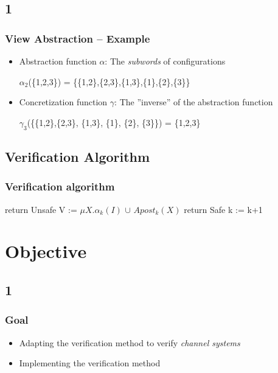 \documentclass[handout]{beamer}
\begin{document}
\subsection*{1}
\begin{frame}
\frametitle{View Abstraction -- Example}
\begin{itemize}
\item
Abstraction function $\alpha$: The \emph{subwords} of configurations
\begin{example}[Abstraction]
  $\alpha_2$(\{1,2,3\}) = \{\{1,2\},\{2,3\},\{1,3\},\{1\},\{2\},\{3\}\}
\end{example}
\item
Concretization function $\gamma$: The ''inverse'' of the abstraction function
\begin{example}[Concretization]
  $\gamma_3$(\{\{1,2\},\{2,3\}, \{1,3\}, \{1\}, \{2\}, \{3\}\}) = \{1,2,3\}
\end{example}
\end{itemize}
\end{frame}
\subsection{Verification Algorithm}
\begin{frame}
  \frametitle{Verification algorithm} %
  \footnotesize
  \begin{algorithmic}[1]
     
    \State return Unsafe
    \EndIf
    \State V := $\mu X.\alpha_k(I)$ $\cup$ $Apost_k(X)$ 
     
    \State return Safe
    \EndIf
    \State k := k+1 
    \EndWhile
  \end{algorithmic}
\end{frame}

\section{Objective}
\subsection*{1}
\begin{frame}
  \frametitle{Goal}
  \begin{itemize}
  \item
    Adapting the verification method to verify \emph{channel systems}
  \item
    Implementing the verification method
  \end{itemize}
\end{frame}
\end{document}
